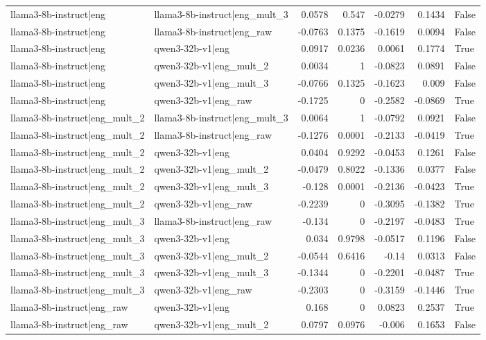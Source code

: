 \begin{table}
\begin{tabular}{l l r r r r l}
llama3-8b-instruct|eng & llama3-8b-instruct|eng_mult_3 & 0.0578 & 0.547 & -0.0279 & 0.1434 & False \\
llama3-8b-instruct|eng & llama3-8b-instruct|eng_raw & -0.0763 & 0.1375 & -0.1619 & 0.0094 & False \\
llama3-8b-instruct|eng & qwen3-32b-v1|eng & 0.0917 & 0.0236 & 0.0061 & 0.1774 & True \\
llama3-8b-instruct|eng & qwen3-32b-v1|eng_mult_2 & 0.0034 & 1 & -0.0823 & 0.0891 & False \\
llama3-8b-instruct|eng & qwen3-32b-v1|eng_mult_3 & -0.0766 & 0.1325 & -0.1623 & 0.009 & False \\
llama3-8b-instruct|eng & qwen3-32b-v1|eng_raw & -0.1725 & 0 & -0.2582 & -0.0869 & True \\
llama3-8b-instruct|eng_mult_2 & llama3-8b-instruct|eng_mult_3 & 0.0064 & 1 & -0.0792 & 0.0921 & False \\
llama3-8b-instruct|eng_mult_2 & llama3-8b-instruct|eng_raw & -0.1276 & 0.0001 & -0.2133 & -0.0419 & True \\
llama3-8b-instruct|eng_mult_2 & qwen3-32b-v1|eng & 0.0404 & 0.9292 & -0.0453 & 0.1261 & False \\
llama3-8b-instruct|eng_mult_2 & qwen3-32b-v1|eng_mult_2 & -0.0479 & 0.8022 & -0.1336 & 0.0377 & False \\
llama3-8b-instruct|eng_mult_2 & qwen3-32b-v1|eng_mult_3 & -0.128 & 0.0001 & -0.2136 & -0.0423 & True \\
llama3-8b-instruct|eng_mult_2 & qwen3-32b-v1|eng_raw & -0.2239 & 0 & -0.3095 & -0.1382 & True \\
llama3-8b-instruct|eng_mult_3 & llama3-8b-instruct|eng_raw & -0.134 & 0 & -0.2197 & -0.0483 & True \\
llama3-8b-instruct|eng_mult_3 & qwen3-32b-v1|eng & 0.034 & 0.9798 & -0.0517 & 0.1196 & False \\
llama3-8b-instruct|eng_mult_3 & qwen3-32b-v1|eng_mult_2 & -0.0544 & 0.6416 & -0.14 & 0.0313 & False \\
llama3-8b-instruct|eng_mult_3 & qwen3-32b-v1|eng_mult_3 & -0.1344 & 0 & -0.2201 & -0.0487 & True \\
llama3-8b-instruct|eng_mult_3 & qwen3-32b-v1|eng_raw & -0.2303 & 0 & -0.3159 & -0.1446 & True \\
llama3-8b-instruct|eng_raw & qwen3-32b-v1|eng & 0.168 & 0 & 0.0823 & 0.2537 & True \\
llama3-8b-instruct|eng_raw & qwen3-32b-v1|eng_mult_2 & 0.0797 & 0.0976 & -0.006 & 0.1653 & False \\

\end{tabular}
\end{table}
